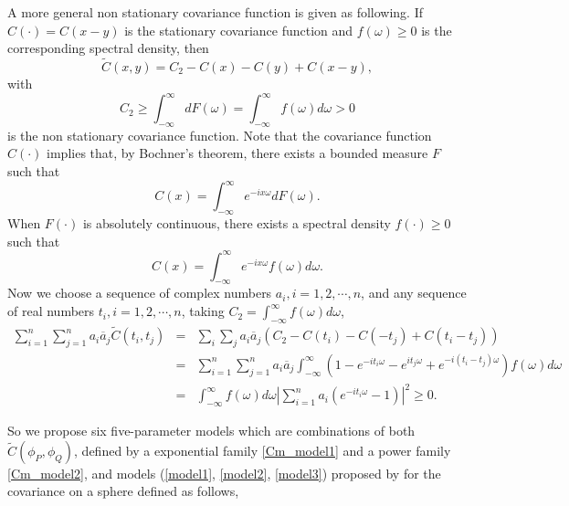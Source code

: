 \begin{enumerate}
		      		      
		      \begin{prop}
		      	A more general non stationary covariance function is given as following. If $C(\cdot) = C(x-y)$ is the stationary covariance function and $f(\omega) \ge 0$ is the corresponding spectral density, then
		      	\[
		      		\tilde{C}(x, y) = C_2 - C(x) - C(y) + C(x-y), 
		      	\]
		      	with 
		      	\[
		      		C_2 \ge \int_{-\infty}^\infty dF(\omega) = \int_{-\infty}^\infty f(\omega)d\omega > 0
		      	\]
		      	is the non stationary covariance function. Note that the covariance function $C(\cdot)$ implies that, by Bochner's theorem, there exists a bounded measure $F$ such that
		      	\[
		      		C(x) = \int_{-\infty}^\infty e^{-ix\omega}dF(\omega).
		      	\]
		      	When $F(\cdot)$ is absolutely continuous, there exists a spectral density $f(\cdot) \ge 0$ such that
		      	\[
		      		C(x) = \int_{-\infty}^\infty e^{-ix\omega}f(\omega)d\omega.
		      	\]
		      	Now we choose a sequence of complex numbers $a_i, i = 1, 2, \cdots, n$, and any sequence of real numbers $t_i, i = 1, 2, \cdots, n$, taking $C_2 = \int_{-\infty}^\infty f(\omega)d\omega$,
		      	\begin{eqnarray*}
		      		\sum_{i=1}^n \sum_{j=1}^n a_i \overline{a}_j \tilde{C}(t_i, t_j) &=& \sum_i \sum_j a_i \overline{a}_j (C_2 - C(t_i) - C(-t_j) + C(t_i-t_j)) \\
		      		&=& \sum_{i=1}^n \sum_{j=1}^n a_i \overline{a}_j \int_{-\infty}^\infty(1-  e^{-it_i\omega} - e^{it_j\omega} + e^{-i(t_i-t_j)\omega})f(\omega)d\omega \\
		      		&=&\int_{-\infty}^\infty f(\omega)d\omega \left|\sum_{i=1}^n a_i(e^{-it_i\omega} - 1)\right|^2 \ge 0.
		      	\end{eqnarray*}
		      \end{prop}
		      		      
		      		      
	\end{enumerate}
	So we propose six five-parameter models which are combinations of both $\tilde{C}(\phi_P, \phi_Q)$, defined by a exponential family \ref{Cm_model1} and a power family \ref{Cm_model2}, and models (\ref{model1}, \ref{model2}, \ref{model3}) proposed by \cite{Huang2012} for the covariance on a sphere defined as follows,
		
